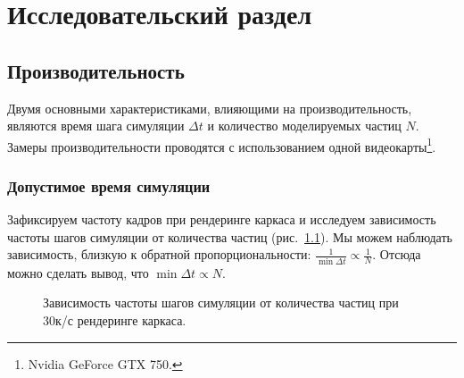 

\chapter{Исследовательский раздел}


\section{Производительность}
Двумя основными характеристиками, влияющими на производительность, являются время шага симуляции $\Delta t$ и количество моделируемых частиц $N$. Замеры производительности проводятся с использованием одной видеокарты\footnote{Nvidia GeForce GTX 750.}.

\subsection{Допустимое время симуляции}
Зафиксируем частоту кадров при рендеринге каркаса и исследуем зависимость частоты шагов симуляции от количества частиц (рис.~\ref{fig:steps-graph}). Мы можем наблюдать зависимость, близкую к обратной пропорциональности: $\frac{1}{\min\Delta t}\propto \frac{1}{N}$. Отсюда можно сделать вывод, что $\min\Delta t\propto N$.
\begin{figure}[h]
  \centering

  \resizebox{.8\textwidth}{!} {
  }

  \caption{Зависимость частоты шагов симуляции от количества частиц при 30к/с рендеринге каркаса.}
  \label{fig:steps-graph}
\end{figure}


